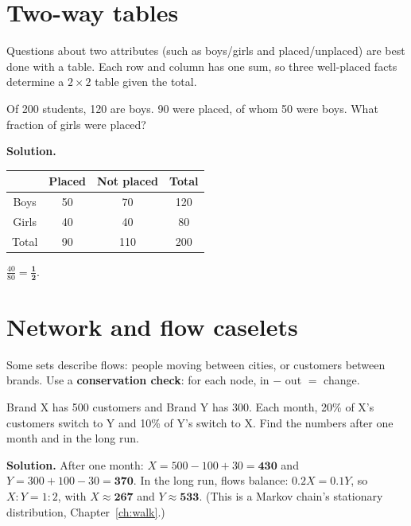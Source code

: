\documentclass[11pt,a4paper,openany]{report}
\begin{document}
\section{Two-way tables}
Questions about two attributes (such as boys/girls and placed/unplaced) are best done with a table. Each row and column has one sum, so three well-placed facts determine a $2\times2$ table given the total.

\begin{example}
Of 200 students, 120 are boys. 90 were placed, of whom 50 were boys. What fraction of girls were placed?

\textbf{Solution.}
\begin{center}\small
\begin{tabular}{c|cc|c}
& Placed & Not placed & Total\\\hline
Boys & 50 & 70 & 120\\
Girls & 40 & 40 & 80\\\hline
Total & 90 & 110 & 200
\end{tabular}
\end{center}
$\frac{40}{80}=\mathbf{\frac12}$.
\end{example}

\section{Network and flow caselets}
Some sets describe flows: people moving between cities, or customers between brands. Use a \textbf{conservation check}: for each node, in $-$ out $=$ change.

\begin{example}
Brand X has 500 customers and Brand Y has 300. Each month, 20\% of X's customers switch to Y and 10\% of Y's switch to X. Find the numbers after one month and in the long run.

\textbf{Solution.} After one month: $X=500-100+30=\mathbf{430}$ and $Y=300+100-30=\mathbf{370}$. In the long run, flows balance: $0.2X=0.1Y$, so $X:Y=1:2$, with $X\approx\mathbf{267}$ and $Y\approx\mathbf{533}$. (This is a Markov chain's stationary distribution, Chapter~\ref{ch:walk}.)
\end{example}
\end{document}
